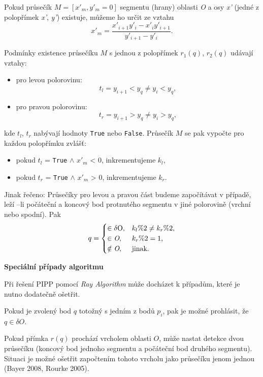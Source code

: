 \par Pokud průsečík $M = [x'_m, y'_m = 0]$ segmentu (hrany) oblasti \emph{O} a osy \emph{x'} (jedné z polopřímek \emph{x'}, \emph{y'}) existuje, můžeme ho určit ze vztahu
\begin{equation}x'_m = \frac{x'_{i+1}y'_i - x'_iy'_{i+1}}{y'_{i+1}-y'_i}.\end{equation}

\par Podmínky existence průsečíku $M$ s jednou z polopřímek $r_1(q)$, $r_2(q)$ udávají vztahy:
\begin{itemize}
    \item pro levou polorovinu: 
        \begin{equation} t_l = y_{i+1} < y_q \neq y_i < y_q,\end{equation}
    \item pro pravou polorovinu:
        \begin{equation} t_r = y_{i+1} > y_q \neq y_i > y_q,\end{equation}
\end{itemize}

\par kde $t_l$, $t_r$ nabývají hodnoty \verb|True| nebo \verb|False|. Průsečík $M$ se pak vypočte pro každou polopřímku zvlášť:
\begin{itemize}
    \item pokud $t_l$ = \verb|True| $\land$ $x'_m$ < 0, inkrementujeme $k_l$,
    \item pokud $t_r$ = \verb|True| $\land$ $x'_m$ > 0, inkrementujeme $k_r$.
\end{itemize}

\par Jinak řečeno: Průsečíky pro levou a pravou část budeme započítávat v případě, leží –li počáteční a koncový bod protnutého segmentu v jiné polorovině (vrchní nebo spodní). Pak
\begin{equation} q =\begin{cases} \in \delta $O$, & \text{$k_l\%2 \neq k_r\%2$,} \\ 
    \in \emph{O}, & \text{$k_r\%2 = 1$,} \\ 
    \notin \emph{O}, & \text{jinak.} 
\end{cases}\end{equation}

\par {\large\textbf{Speciální případy algoritmu} }
\par Při řešení PIPP pomocí \emph{Ray Algorithm} může docházet k případům, které je nutno dodatečně ošetřit.
\par Pokud je zvolený bod $q$ totožný s jedním z bodů $p_i$, pak je možné prohlásit, že $q \in \delta O$.
\par Pokud přímka $r(q)$ prochází vrcholem oblasti $O$, může nastat detekce dvou průsečíku (koncový bod jednoho segmentu a počáteční bod druhého segmentu). Situaci je možné ošetřit započtením tohoto vrcholu jako průsečíku jenom jednou (Bayer 2008, Rourke 2005).

